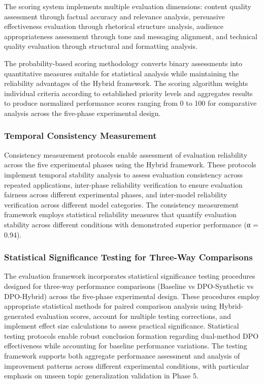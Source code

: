 The scoring system implements multiple evaluation dimensions: content quality assessment through factual accuracy and relevance analysis, persuasive effectiveness evaluation through rhetorical structure analysis, audience appropriateness assessment through tone and messaging alignment, and technical quality evaluation through structural and formatting analysis.

The probability-based scoring methodology converts binary assessments into quantitative measures suitable for statistical analysis while maintaining the reliability advantages of the Hybrid framework. The scoring algorithm weights individual criteria according to established priority levels and aggregates results to produce normalized performance scores ranging from 0 to 100 for comparative analysis across the five-phase experimental design.

\subsubsection{Temporal Consistency Measurement}

Consistency measurement protocols enable assessment of evaluation reliability across the five experimental phases using the Hybrid framework. These protocols implement temporal stability analysis to assess evaluation consistency across repeated applications, inter-phase reliability verification to ensure evaluation fairness across different experimental phases, and inter-model reliability verification across different model categories. The consistency measurement framework employs statistical reliability measures that quantify evaluation stability across different conditions with demonstrated superior performance (α = 0.94).

\subsubsection{Statistical Significance Testing for Three-Way Comparisons}

The evaluation framework incorporates statistical significance testing procedures designed for three-way performance comparisons (Baseline vs DPO-Synthetic vs DPO-Hybrid) across the five-phase experimental design. These procedures employ appropriate statistical methods for paired comparison analysis using Hybrid-generated evaluation scores, account for multiple testing corrections, and implement effect size calculations to assess practical significance. Statistical testing protocols enable robust conclusion formation regarding dual-method DPO effectiveness while accounting for baseline performance variations. The testing framework supports both aggregate performance assessment and analysis of improvement patterns across different experimental conditions, with particular emphasis on unseen topic generalization validation in Phase 5.


